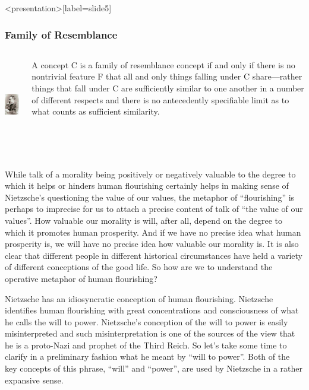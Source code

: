 \begin{frame}<presentation>[label=slide5]
    \frametitle{Family of Resemblance}
        \begin{columns}
            \begin{column}{3cm}
                \includegraphics[height=4cm]{../../graphics/nietzsche.jpg}
            \end{column}
            \begin{column}{7cm}
                A concept \alert{C} is a family of resemblance concept if and only if there is no nontrivial feature \alert{F} that all and only things falling under \alert{C} share---rather things that fall under \alert{C} are sufficiently similar to one another in a number of different respects and there is no antecedently specifiable limit as to what counts as sufficient similarity.
            \end{column}
        \end{columns}
\end{frame}

While talk of a morality being positively or negatively valuable to the degree to which it helps or hinders human flourishing certainly helps in making sense of Nietzsche's questioning the value of our values, the metaphor of ``flourishing'' is perhaps to imprecise for us to attach a precise content of talk of ``the value of our values''. How valuable our morality is will, after all, depend on the degree to which it promotes human prosperity. And if we have no precise idea what human prosperity is, we will have no precise idea how valuable our morality is. It is also clear that different people in different historical circumstances have held a variety of different conceptions of the good life. So how are we to understand the operative metaphor of human flourishing?

Nietzsche has an idiosyncratic conception of human flourishing. Nietzsche identifies human flourishing with great concentrations and consciousness of what he calls the will to power. Nietzsche's conception of the will to power is easily misinterpreted and such misinterpretation is one of the sources of the view that he is a proto-Nazi and prophet of the Third Reich. So let's take some time to clarify in a preliminary fashion what he meant by ``will to power''. Both of the key concepts of this phrase, ``will'' and ``power'', are used by Nietzsche in a rather expansive sense.

